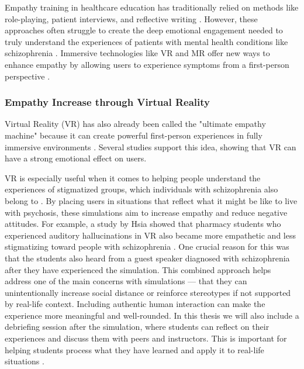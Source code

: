 Empathy training in healthcare education has traditionally relied on methods like role-playing, patient interviews, and reflective writing \cite{Batt-Rawden2013}. However, these approaches often struggle to create the deep emotional engagement needed to truly understand the experiences of patients with mental health conditions like schizophrenia \cite{Hsia2022, Formosa2018}. Immersive technologies like VR and MR offer new ways to enhance empathy by allowing users to experience symptoms from a first-person perspective \cite{Krogmeier2024, Silva2017}.

\subsubsection{Empathy Increase through Virtual Reality}

Virtual Reality (VR) has also already been called the "ultimate empathy machine" because it can create powerful first-person experiences in fully immersive environments \cite{Milk2015}. Several studies support this idea, showing that VR can have a strong emotional effect on users.

VR is especially useful when it comes to helping people understand the experiences of stigmatized groups, which individuals with schizophrenia also belong to \cite{Formosa2018, Marques2022, Mattsson2024}. By placing users in situations that reflect what it might be like to live with psychosis, these simulations aim to increase empathy and reduce negative attitudes. For example, a study by Hsia \cite{Hsia2022} showed that pharmacy students who experienced auditory hallucinations in VR also became more empathetic and less stigmatizing toward people with schizophrenia \cite{Hsia2022}. One crucial reason for this was that the students also heard from a guest speaker diagnosed with schizophrenia after they have experienced the simulation. This combined approach helps address one of the main concerns with simulations — that they can unintentionally increase social distance or reinforce stereotypes if not supported by real-life context. Including authentic human interaction can make the experience more meaningful and well-rounded. In this thesis we will also include a debriefing session after the simulation, where students can reflect on their experiences and discuss them with peers and instructors. This is important for helping students process what they have learned and apply it to real-life situations \cite{Hsia2022}.

\vspace{1em}

